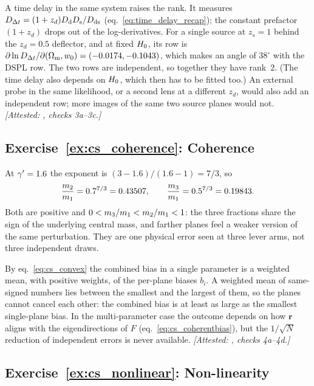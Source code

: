A time delay in the same system raises the rank. It measures
$D_{\Delta t}=(1+z_d)D_{\mathrm{d}}D_{\mathrm{s}}/D_{\mathrm{ds}}$ (eq.~\ref{eq:time_delay_recap});
the constant prefactor $(1+z_d)$ drops out of the log-derivatives.
For a single source at $z_s=1$ behind the $z_d=0.5$ deflector, and at
fixed $H_0$, its row is
$\partial\ln D_{\Delta t}/\partial(\Omega_{\mathrm{m}},w_0)=(-0.0174,-0.1043)$,
which makes an angle of $38^\circ$ with the DSPL row. The two rows are
independent, so together they have rank~$2$. (The time delay also
depends on $H_0$, which then has to be fitted too.) An external
probe in the same likelihood, or a second lens at a different $z_d$,
would also add an independent row; more images of the same two source
planes would not.
\emph{[Attested: , checks 3a--3c.]}

\subsection*{Exercise~\ref{ex:cs_coherence}: Coherence}

At $\gamma'=1.6$ the exponent is $(3-1.6)/(1.6-1)=7/3$, so
\[
  \frac{m_2}{m_1}=0.7^{7/3}=0.43507,\qquad
  \frac{m_3}{m_1}=0.5^{7/3}=0.19843 .
\]
Both are positive and $0<m_3/m_1<m_2/m_1<1$: the three
fractions share the sign of the underlying central mass, and farther
planes feel a weaker version of the same perturbation. They are one
physical error seen at three lever arms, not three independent draws.

By eq.~\eqref{eq:cs_convex} the combined bias in a single parameter is a
weighted mean, with positive weights, of the per-plane biases $b_i$. A
weighted mean of same-signed numbers lies between the smallest and the
largest of them, so the planes cannot cancel each other: the combined
bias is at least as large as the smallest single-plane bias. In the
multi-parameter case the outcome depends on how $\bm{r}$ aligns with the
eigendirections of $F$ (eq.~\ref{eq:cs_coherentbias}), but the
$1/\sqrt{N}$ reduction of independent errors is never available.
\emph{[Attested: , checks 4a--4d.]}

\subsection*{Exercise~\ref{ex:cs_nonlinear}: Non-linearity}

